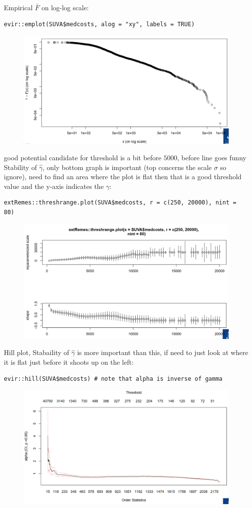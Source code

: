 \documentclass[11pt]{article}
\newcommand{\noi}{\noindent}
\begin{document}
\noi Empirical $\bar{F}$ on log-log scale:
\begin{lstlisting}
evir::emplot(SUVA$medcosts, alog = "xy", labels = TRUE)
\end{lstlisting}
\begin{figure}[H]
    \centering
    \includegraphics[width=0.7\linewidth]{GPD - example - empirical log-log.png}
\end{figure}
\noi good potential candidate for threshold is a bit before $5000$, before line goes funny \\

\noi Stability of $\hat{\gamma}$, only bottom graph is important (top concerns the scale $\sigma$ so ignore), need to find an area where the plot is flat then that is a good threshold value and the y-axis indicates the $\gamma$:
\begin{lstlisting}
extRemes::threshrange.plot(SUVA$medcosts, r = c(250, 20000), nint = 80)
\end{lstlisting}
\begin{figure}[H]
    \centering
    \includegraphics[width=0.7\linewidth]{GPD - example - stability of gamma.png}
\end{figure}

\noi Hill plot, Stabaility of $\hat{\gamma}$ is more important than this, if need to just look at where it is flat just before it shoots up on the left:
\begin{lstlisting}
evir::hill(SUVA$medcosts) # note that alpha is inverse of gamma
\end{lstlisting}
\begin{figure}[H]
    \centering
    \includegraphics[width=0.7\linewidth]{GPD - example - hill plot.png}
\end{figure}
\end{document}
